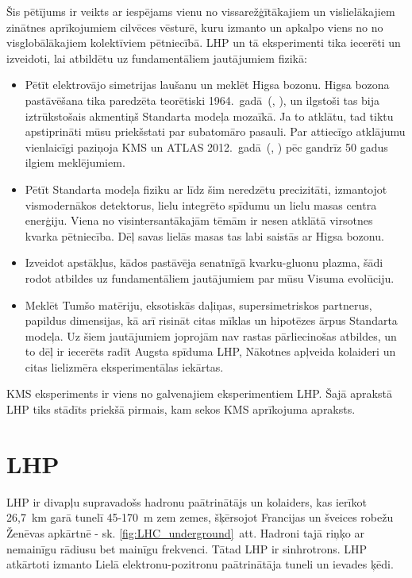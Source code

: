 \label{sec:experimental_setup}

Šis pētījums ir veikts ar iespējams vienu no vissarežģītākajiem un vislielākajiem zinātnes aprīkojumiem cilvēces vēsturē, kuru izmanto un apkalpo viens no no visglobālākajiem kolektīviem pētniecībā. LHP un tā eksperimenti tika iecerēti un izveidoti, lai atbildētu uz fundamentāliem jautājumiem fizikā:

\begin{itemize}
\item Pētīt elektrovājo simetrijas laušanu un meklēt Higsa bozonu. Higsa bozona pastāvēšana tika paredzēta teorētiski 1964.~gadā~(\cite{Higgs:1964ia}, \cite{Englert:1964et}), un ilgstoši tas bija iztrūkstošais akmentiņš Standarta modeļa mozaīkā. Ja to atklātu, tad tiktu apstiprināti mūsu priekšstati par subatomāro pasauli. Par attiecīgo atklājumu vienlaicīgi paziņoja KMS un ATLAS 2012.~gadā~(\cite{Chatrchyan:2012xdj}, \cite{Aad:2012tfa}) pēc gandrīz 50 gadus ilgiem meklējumiem.
\item Pētīt Standarta modeļa fiziku ar līdz šim neredzētu precizitāti, izmantojot vismodernākos detektorus, lielu integrēto spīdumu un lielu masas centra enerģiju. Viena no visintersantākajām tēmām ir nesen atklātā virsotnes kvarka pētniecība. Dēļ savas lielās masas tas labi saistās ar Higsa bozonu.
\item Izveidot apstākļus, kādos pastāvēja senatnīgā kvarku-gluonu plazma, šādi rodot atbildes uz fundamentāliem jautājumiem par mūsu Visuma evolūciju.
\item Meklēt Tumšo matēriju, eksotiskās daļiņas, supersimetriskos partnerus, \gls{papildus dimensijas}, kā arī risināt citas mīklas un hipotēzes ārpus Standarta modeļa. Uz šiem jautājumiem joprojām nav rastas pārliecinošas atbildes, un to dēļ ir iecerēts radīt \gls{Augsta spīduma LHP}, \gls{Nākotnes apļveida kolaideri} un citas lielizmēra eksperimentālas iekārtas. 
\end {itemize}

KMS eksperiments ir viens no galvenajiem eksperimentiem LHP. Šajā aprakstā LHP tiks stādīts priekšā pirmais, kam sekos KMS aprīkojuma apraksts.

\section{LHP}

LHP ir divapļu supravadošs hadronu paātrinātājs un kolaiders, kas ierīkot 26,7~km garā tunelī 45-170~m zem zemes, šķērsojot Francijas un šveices robežu Ženēvas apkārtnē - sk. \ref{fig:LHC_underground}~att. Hadroni tajā riņķo ar nemainīgu rādiusu bet mainīgu frekvenci. Tātad LHP ir sinhrotrons. LHP atkārtoti izmanto Lielā elektronu-pozitronu paātrinātāja tuneli un \gls{ievades ķēdi}.


